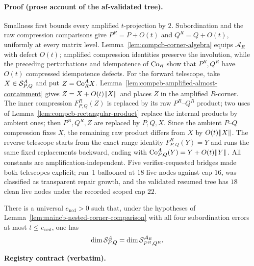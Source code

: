 \paragraph{Proof (prose account of the af-validated tree).}
Smallness first bounds every amplified $t$-projection by $2$. Subordination and the
raw compression comparisons give $P^R=P+O(t)$ and $Q^R=Q+O(t)$, uniformly at every
matrix level. Lemma~\ref{lem:compcb-corner-algebra} equips $\mathcal A_R$ with defect
$O(t)$; amplified compression identities preserve the involution, while the preceding
perturbations and idempotence of $\mathrm{Co}_{R}$ show that $P^R,Q^R$ have $O(t)$ compressed
idempotence defects.
For the forward telescope, take $X\in\mathcal S_{P,Q}^A$ and put $Z=\mathrm{Co}_{R}^A X$.
Lemma~\ref{lem:compcb-amplified-almost-containment} gives $Z=X+O(t)\lVert X\rVert$ and places
$Z$ in the amplified $R$-corner. The inner compression $F^R_{P,Q}(Z)$ is replaced by
its raw $P^R$--$Q^R$ product; two uses of
Lemma~\ref{lem:compcb-rectangular-product} replace the internal products by ambient
ones; then $P^R,Q^R,Z$ are replaced by $P,Q,X$. Since the ambient $P$--$Q$
compression fixes $X$, the remaining raw product differs from $X$ by $O(t)\lVert X\rVert$.
The reverse telescope starts from the exact range identity $F^R_{P,Q}(Y)=Y$ and runs
the same fixed replacements backward, ending with $\mathrm{Co}_{P,Q}^A(Y)=Y+O(t)\lVert Y\rVert$.
All constants are amplification-independent. Five verifier-requested bridges made both
telescopes explicit; run~1 ballooned at $18$ live nodes against cap $16$, was classified
as transparent repair growth, and the validated resumed tree has $18$ clean live nodes
under the recorded scoped cap $22$.

\begin{lemma}\label{lem:maincb-nested-corner-dimension-transport}
There is a universal $e_{\mathrm{ncd}}>0$ such that, under the hypotheses of
Lemma~\ref{lem:maincb-nested-corner-comparison} with all four subordination errors at
most $t\le e_{\mathrm{ncd}}$, one has
\[
  \dim\mathcal S_{P,Q}^A=\dim\mathcal S_{P^R,Q^R}^{\mathcal A_R}.
\]
\end{lemma}
\noindent\textbf{Registry contract (verbatim).}
